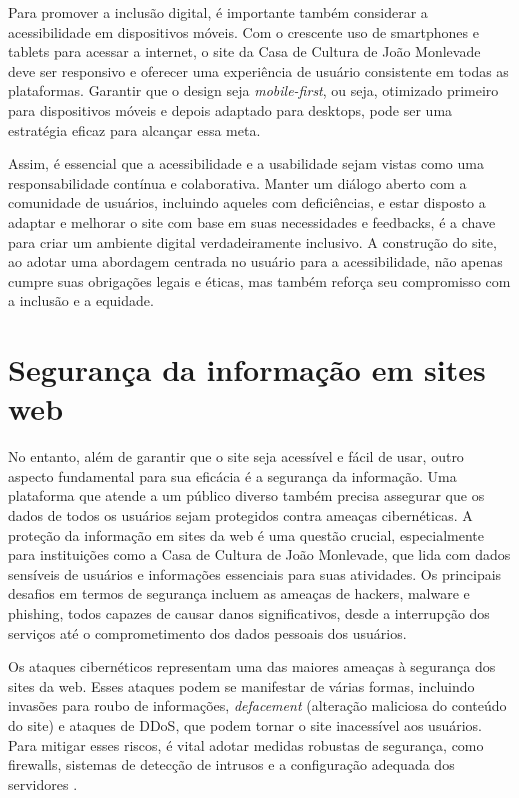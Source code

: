 Para promover a inclusão digital, é importante também considerar a acessibilidade em dispositivos móveis. Com o crescente uso de smartphones e tablets para acessar a internet, o site da Casa de Cultura de João Monlevade deve ser responsivo e oferecer uma experiência de usuário consistente em todas as plataformas. Garantir que o design seja \textit{mobile-first}, ou seja, otimizado primeiro para dispositivos móveis e depois adaptado para desktops, pode ser uma estratégia eficaz para alcançar essa meta.

Assim, é essencial que a acessibilidade e a usabilidade sejam vistas como uma responsabilidade contínua e colaborativa. Manter um diálogo aberto com a comunidade de usuários, incluindo aqueles com deficiências, e estar disposto a adaptar e melhorar o site com base em suas necessidades e feedbacks, é a chave para criar um ambiente digital verdadeiramente inclusivo. A construção do site, ao adotar uma abordagem centrada no usuário para a acessibilidade, não apenas cumpre suas obrigações legais e éticas, mas também reforça seu compromisso com a inclusão e a equidade.


\section{Segurança da informação em sites web}

No entanto, além de garantir que o site seja acessível e fácil de usar, outro aspecto fundamental para sua eficácia é a segurança da informação. Uma plataforma que atende a um público diverso também precisa assegurar que os dados de todos os usuários sejam protegidos contra ameaças cibernéticas. A proteção da informação em sites da web é uma questão crucial, especialmente para instituições como a Casa de Cultura de João Monlevade, que lida com dados sensíveis de usuários e informações essenciais para suas atividades. Os principais desafios em termos de segurança incluem as ameaças de hackers, malware e phishing, todos capazes de causar danos significativos, desde a interrupção dos serviços até o comprometimento dos dados pessoais dos usuários.

Os ataques cibernéticos representam uma das maiores ameaças à segurança dos sites da web. Esses ataques podem se manifestar de várias formas, incluindo invasões para roubo de informações, \textit{defacement} (alteração maliciosa do conteúdo do site) e ataques de \ac{DDoS}, que podem tornar o site inacessível aos usuários. Para mitigar esses riscos, é vital adotar medidas robustas de segurança, como firewalls, sistemas de detecção de intrusos e a configuração adequada dos servidores \cite{li2021comprehensive}.

